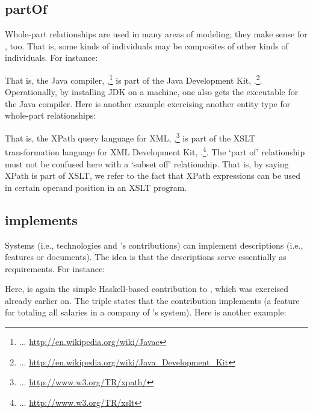 \begin{comment}
Mentoring illustrates what?
What else illustrates what?
\end{comment}


\subsection{partOf}

Whole-part relationships are used in many areas of modeling; they make
sense for \solasote, too. That is, some kinds of \solasote{}
individuals may be composites of other kinds of \solasote{}
individuals. For instance:


\noindent
That is, the Java compiler,
,\footnote{... 
  \url{http://en.wikipedia.org/wiki/Javac}} is part of the Java
Development Kit, .\footnote{... 
  \url{http://en.wikipedia.org/wiki/Java_Development_Kit}}. Operationally,
by installing JDK on a machine, one also gets the executable for the
Java compiler. Here is another example exercising another entity type
for whole-part relationships:


\noindent
That is, the XPath query language for XML,
,\footnote{... 
  \url{http://www.w3.org/TR/xpath/}} is part of the XSLT
transformation language for XML
Development Kit, .\footnote{... 
  \url{http://www.w3.org/TR/xslt}}. The `part of' relationship must not
be confused here with a `subset off' relationship. That is, by saying
XPath is part of XSLT, we refer to the fact that XPath expressions can
be used in certain operand position in an XSLT program. 


\subsection{implements}

Systems (i.e., technologies and \ooo{}'s contributions) can implement
descriptions (i.e., features or documents). The idea is that the
descriptions serve essentially as requirements. For instance:


\noindent
Here,  is again the simple Haskell-based
contribution to \ooo{}, which was exercised already earlier on. The
triple states that the contribution implements  (a
feature for totaling all salaries in a company of \ooo{}'s
system). Here is another example:

